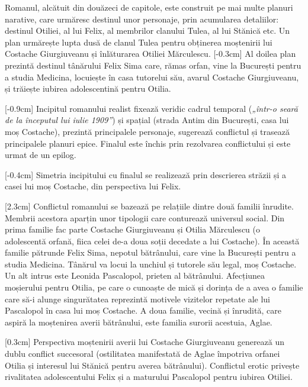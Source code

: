 Romanul, alcătuit din douăzeci de capitole, este construit pe mai multe planuri narative, care urmăresc destinul unor personaje, prin acumularea detaliilor: destinul Otiliei, al lui Felix, al membrilor clanului Tulea, al lui Stănică etc. Un plan urmărește lupta dusă de clanul Tulea pentru obținerea moștenirii lui Costache Giurgiuveanu și înlăturarea Otiliei Mărculescu.
[-0.3cm]
Al doilea plan prezintă destinul tânărului Felix Sima care, rămas orfan, vine la București pentru a studia Medicina, locuiește în casa tutorelui său, avarul Costache Giurgiuveanu, și trăiește iubirea adolescentină pentru Otilia.

[-0.9cm]
Incipitul romanului realist fixează veridic cadrul temporal (\textit{„într-o seară de la începutul lui iulie 1909”}) și spațial (strada Antim din București, casa lui moș Costache), prezintă principalele personaje, sugerează conflictul și trasează principalele planuri epice. Finalul este închis prin rezolvarea conflictului și este urmat de un epilog.

[-0.4cm]
Simetria incipitului cu finalul se realizează prin descrierea străzii și a casei lui moș Costache, din perspectiva lui Felix.

[2.3cm]
Conflictul romanului se bazează pe relațiile dintre două familii înrudite. Membrii acestora aparțin unor tipologii care conturează universul social. Din prima familie fac parte Costache Giurgiuveanu și Otilia Mărculescu (o adolescentă orfană, fiica celei de-a doua soții decedate a lui Costache). În această familie pătrunde Felix Sima, nepotul bătrânului, care vine la București pentru a studia Medicina. Tânărul va locui la unchiul și tutorele său legal, moș Costache. Un alt intrus este Leonida Pascalopol, prieten al bătrânului. Afecțiunea moșierului pentru Otilia, pe care o cunoaște de mică și dorința de a avea o familie care să-i alunge singurătatea reprezintă motivele vizitelor repetate ale lui Pascalopol în casa lui moș Costache. A doua familie, vecină și înrudită, care aspiră la moștenirea averii bătrânului, este familia surorii acestuia, Aglae.

[0.3cm]
Perspectiva moștenirii averii lui Costache Giurgiuveanu generează un dublu conflict succesoral (ostilitatea manifestată de Aglae împotriva orfanei Otilia și interesul lui Stănică pentru averea bătrânului). Conflictul erotic privește rivalitatea adolescentului Felix și a maturului Pascalopol pentru iubirea Otiliei.


